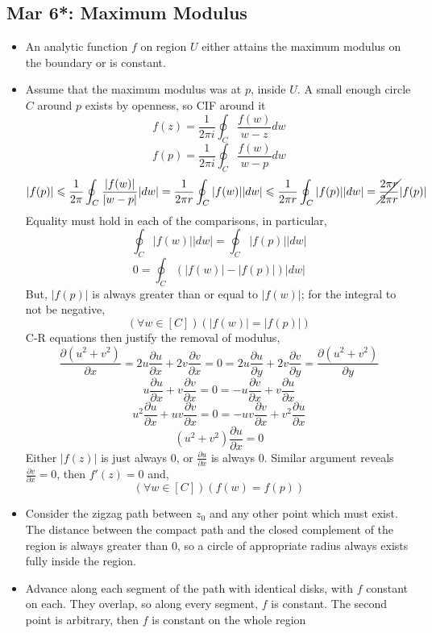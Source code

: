 \documentclass[10pt, oneside]{article}
\let\del\partial
\let\leq\leqslant
\begin{document}
\subsection{Mar 6*: Maximum Modulus}
\begin{itemize}
    \item An analytic function $f$ on region $U$ either attains the maximum modulus on the boundary or is constant.
    \item Assume that the maximum modulus was at $p$, inside $U$. A small enough circle $C$ around $p$ exists by openness, so CIF around it
        \[f(z) = \frac{1}{2\pi i} \oint_C \frac{f(w)}{w-z} dw\]
        \[f(p) = \frac{1}{2\pi i} \oint_C \frac{f(w)}{w-p} dw\]
        \[|f(p)| \leq \frac{1}{2\pi} \oint_C \frac{|f(w)|}{|w-p|} |dw| = \frac{1}{2\pi r} \oint_C |f(w)| |dw| \leq \frac{1}{2\pi r} \oint_C |f(p)||dw| = \cancel{\frac{2\pi r}{2\pi r}} |f(p)|\]
        Equality must hold in each of the comparisons, in particular,
        \[\oint_C |f(w)||dw| = \oint_C |f(p)||dw|\]
        \[0 = \oint_C (|f(w)| - |f(p)|) |dw|\]
        But, $|f(p)|$ is always greater than or equal to $|f(w)|$; for the integral to not be negative, 
        \[(\forall w \in [C]) (|f(w)| = |f(p)|)\]
        C-R equations then justify the removal of modulus,
        \[\frac{\del(u^2 + v^2)}{\del x} = 2u \frac{\del u}{\del x} + 2v\frac{\del v}{\del x} = 0 = 2u \frac{\del u}{\del y} + 2v\frac{\del v}{\del y}  = \frac{\del(u^2 + v^2)}{\del y}\]
        \[u \frac{\del u}{\del x} + v \frac{\del v}{\del x} = 0 = - u \frac{\del v}{\del x} + v \frac{\del u}{\del x}\]
        \[u^2 \frac{\del u}{\del x} + uv \frac{\del v}{\del x} = 0 = - uv \frac{\del v}{\del x} + v^2 \frac{\del u}{\del x}\]
        \[(u^2 + v^2) \frac{\del u}{\del x} = 0\]
        Either $|f(z)|$ is just always $0$, or $\frac{\del u}{\del x}$ is always $0$. Similar argument reveals $\frac{\del v}{\del x} = 0$, then $f'(z) = 0$ and,
        \[(\forall w \in [C]) (f(w) = f(p))\]
    \item Consider the zigzag path between $z_0$ and any other point which must exist. The distance between the compact path and the closed complement of the region is always greater than $0$, so a circle of appropriate radius always exists fully inside the region.
    \item Advance along each segment of the path with identical disks, with $f$ constant on each. They overlap, so along every segment, $f$ is constant. The second point is arbitrary, then $f$ is constant on the whole region
\end{itemize}
\end{document}
